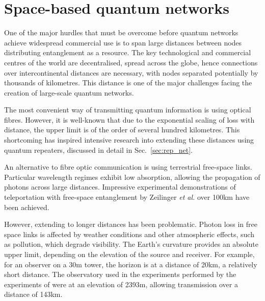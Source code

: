 %
%

\section{Space-based quantum networks}\label{sec:quant_space_race}

One of the major hurdles that must be overcome before quantum networks achieve widespread commercial use is to span large distances between nodes distributing entanglement as a resource. The key technological and commercial centres of the world are decentralised, spread across the globe, hence connections over intercontinental distances are necessary, with nodes separated potentially by thousands of kilometres. This distance is one of the major challenges facing the creation of large-scale quantum networks.

The most convenient way of transmitting quantum information is using optical fibres. However, it is well-known that due to the exponential scaling of loss with distance, the upper limit is of the order of several hundred kilometres. This shortcoming has inspired intensive research into extending these distances using quantum repeaters, discussed in detail in Sec.~\ref{sec:rep_net}.

An alternative to fibre optic communication is using terrestrial free-space links. Particular wavelength regimes exhibit low absorption, allowing the propagation of photons across large distances. Impressive experimental demonstrations of teleportation with free-space entanglement by Zeilinger \textit{et al.} \cite{bib:ursin07, bib:ma2012quantum, bib:yin2013lower} over 100km have been achieved.

However, extending to longer distances has been problematic. Photon loss in free space links is affected by weather conditions and other atmospheric effects, such as pollution, which degrade visibility. The Earth's curvature provides an absolute upper limit, depending on the elevation of the source and receiver. For example, for an observer on a 30m tower, the horizon is at a distance of 20km, a relatively short distance. The observatory used in the experiments performed by the experiments of \cite{bib:ursin07, bib:ma2012quantum} were at an elevation of 2393m, allowing transmission over a distance of 143km.

